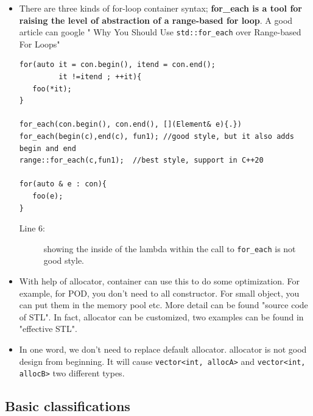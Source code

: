 \documentclass[a4paper,11pt,twoside]{book}
\begin{document}
\begin{itemize}
\item There are three kinds of for-loop container syntax; \textbf{for\_each is a tool for raising the level of abstraction of a range-based for loop}. A good article can google " Why You Should Use \texttt{std::for\_each} over Range-based For Loops"
\begin{lstlisting}
for(auto it = con.begin(), itend = con.end();
         it !=itend ; ++it){
   foo(*it);
}

for_each(con.begin(), con.end(), [](Element& e){.})
for_each(begin(c),end(c), fun1); //good style, but it also adds begin and end
range::for_each(c,fun1);  //best style, support in C++20

for(auto & e : con){
   foo(e);
}
\end{lstlisting}
\begin{description}
\item[Line 6:] showing the inside of the lambda within the call to \texttt{for\_each} is not good style.
\end{description}


	\item With help of allocator, container can use this to do some optimization. For example, for POD, you don't need to all constructor. For small object, you can put them in the memory pool etc.  More detail can be found "source code of STL". In fact, allocator can be customized, two examples can be found in "effective STL". 
	
	\item In one word, we don't need to replace default allocator. allocator is not good design from beginning. It will cause \texttt{vector<int, allocA>} and \texttt{vector<int, allocB>} two different types. 
\end{itemize}


\subsection{Basic classifications}
\end{document}
